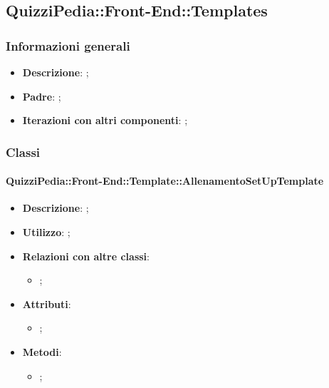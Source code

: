 \newpage

\subsection{QuizziPedia::Front-End::Templates}

	\subsubsection{Informazioni generali}
		\begin{itemize}
			\item \textbf{Descrizione}: ;
			\item \textbf{Padre}: ;
			\item \textbf{Iterazioni con altri componenti}: ;
		\end{itemize}

	\subsubsection{Classi}
		\paragraph{QuizziPedia::Front-End::Template::AllenamentoSetUpTemplate}
			\begin{itemize}
				\item \textbf{Descrizione}: ;
				\item \textbf{Utilizzo}: ;
				\item \textbf{Relazioni con altre classi}: 
					\begin{itemize}
						\item ;
					\end{itemize}
				\item \textbf{Attributi}: 
					\begin{itemize}
						\item ;
					\end{itemize}
				\item \textbf{Metodi}: 
					\begin{itemize}
						\item ;
					\end{itemize}
			\end{itemize}

